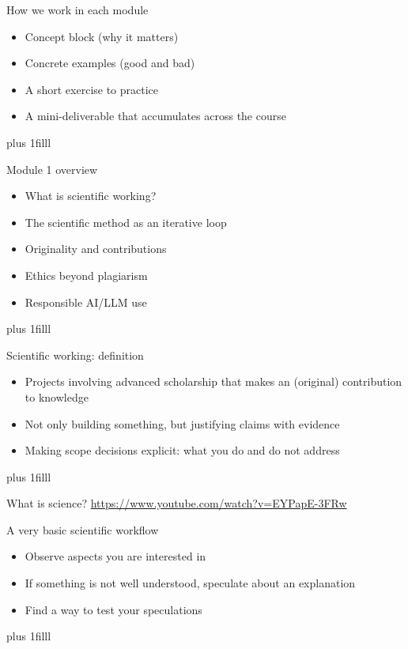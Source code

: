\documentclass[aspectratio=169]{beamer}
\newcommand{\btVFill}{\vskip0pt plus 1filll}
\begin{document}
\begin{frame}{How we work in each module}
  \begin{itemize}
    \item Concept block (why it matters)
    \item Concrete examples (good and bad)
    \item A short exercise to practice
    \item A mini-deliverable that accumulates across the course
  \end{itemize}
\btVFill
\end{frame}


\begin{frame}{Module 1 overview}
  \begin{itemize}
    \item What is scientific working?
    \item The scientific method as an iterative loop
    \item Originality and contributions
    \item Ethics beyond plagiarism
    \item Responsible AI/LLM use
  \end{itemize}\btVFill

\end{frame}

\begin{frame}{Scientific working: definition}
  \begin{itemize}
    \item Projects involving advanced scholarship that makes an (original) contribution to knowledge
    \item Not only building something, but justifying claims with evidence
    \item Making scope decisions explicit: what you do and do not address
  \end{itemize}
\btVFill
\end{frame}


\begin{frame}{What is science?}
 \url{https://www.youtube.com/watch?v=EYPapE-3FRw}
\end{frame}


\begin{frame}{A very basic scientific workflow}
  \begin{itemize}
    \item Observe aspects you are interested in
    \item If something is not well understood, speculate about an explanation
    \item Find a way to test your speculations
  \end{itemize}
    \btVFill
\end{frame}
\end{document}
